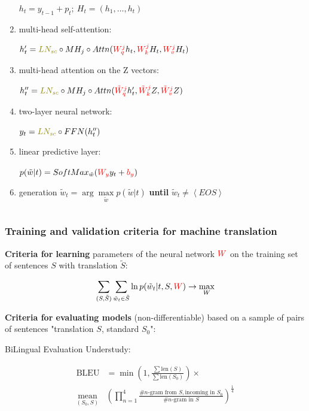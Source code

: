 \documentclass[fullscreen=true, bookmarks=true, hyperref={pdfencoding=unicode}]{beamer}
\begin{document}
\begin{frame}
\begin{columns}
\begin{column}{.68\paperwidth}
\begin{enumerate}
          $h_t = y_{t-1} + p_t; \ H_t = (h_1, \dots, h_t)$

          \pause
          \item multi-head self-attention:

          $h_t^\prime = {\color{olive} LN_{sc}} \circ MH_j \circ Attn({\color{red}W_q^j} h_{t}, {\color{red} W_k^j} H_t, {\color{red}W_v^j} H_t)$
          \pause
          \item multi-head attention on the Z vectors:

          $h_t^{\prime\prime} = {\color{olive} LN_{sc}} \circ MH_j \circ Attn({\color{red}\tilde W_q^j} h_{t}^\prime, {\color{red}\tilde W_k^j} Z, {\color{red}\tilde W_v^j} Z)$
          \pause
          \item two-layer neural network:

          $y_t = {\color{olive} LN_{sc}} \circ FFN(h_t^{\prime\prime})$
          \pause
          \item linear predictive layer:

          $p(\tilde w|t) = SoftMax_{\tilde w}({\color{red} W_y} y_t + {\color{red} b_y})$

          \pause
          \item generation $\tilde w_t = \arg\max\limits_{\tilde w} p(\tilde w|t)$ \textbf{until} $\tilde w_t \neq \left<EOS\right>$
        \end{enumerate}
      \end{column}
    \end{columns}
\end{frame}


\begin{frame}
\frametitle{Training and validation criteria for machine translation}

  {\bf Criteria for learning} parameters of the neural network $\color{red}{W}$ on the training set of sentences $S$ with translation $\tilde S$:

  $$ \sum\limits_{(S, \tilde S)} \sum\limits_{\tilde w_t \in \tilde S} \ln p(\tilde w_t|t, S, {\color{red}W}) \to \max\limits_W $$

  \pause
  {\bf Criteria for evaluating models} (non-differentiable) based on a sample of pairs of sentences "translation $S$, standard $S_0$":

  BiLingual Evaluation Understudy:

  \begin{align*}
    \text{BLEU} &= \min \left(1, \frac{\sum \text{len}(S)}{\sum \text{len}(S_0)} \right) \times \\
    \underset{(S_0, S)}{\text{mean}}&\left(\prod\limits_{n=1}^4 \frac{\#n\text{-gram from } S, \text{incoming in } S_0}{\#n\text{-gram in } S} \right)^{\frac14}
  \end{align*}
\end{frame}
\end{document}

